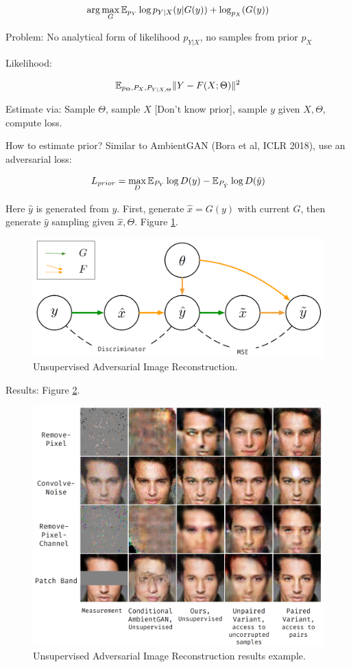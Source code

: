 \documentclass[english]{article}
\begin{document}
$$\arg\max_G \mathbb{E}_{p_Y}\log p_{Y|X}(y|G(y))+\log_{p_X}(G(y))$$

Problem: No analytical form of likelihood $p_{Y|X}$, no samples from prior $p_X$

Likelihood: 

$$\mathbb{E}_{p_\Theta,P_X,P_{Y|X,\Theta}}\|Y-F(X;\Theta)\|^2$$

Estimate via: Sample $\Theta$, sample $X$ [Don't know prior], sample $y$ given $X,\Theta$, compute loss. 

How to estimate prior? Similar to AmbientGAN (Bora et al, ICLR 2018), use an adversarial loss:

$$L_{prior} = \max_D 
\mathbb{E}_{P_{Y}}\log D(y)
- 
\mathbb{E}_{P_{\hat Y}}\log D(\hat  y)$$

Here $\hat y$ is generated from $y$. First, generate $\hat x = G(y)$ with current $G$, then generate $\hat y$ sampling given $\hat x,\Theta$. Figure \ref{UAIR}.

\begin{figure}
  \centering
  \includegraphics[scale=0.3]{UAIR}
  \caption{Unsupervised Adversarial Image Reconstruction.}
  \label{UAIR} 
\end{figure}

Results: Figure \ref{UAIRr}.

\begin{figure}
  \centering
  \includegraphics[scale=0.3]{UAIR_results}
  \caption{Unsupervised Adversarial Image Reconstruction results example.}
  \label{UAIRr}
\end{figure}
\end{document}
